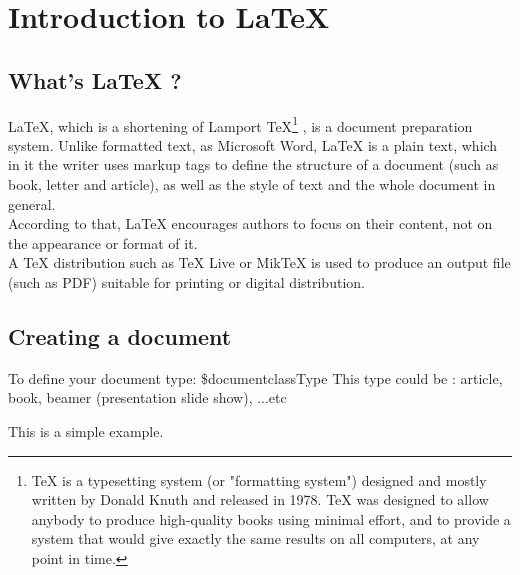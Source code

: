 \chapter{Introduction to LaTeX}

\section{What's LaTeX ?}
\huge LaTeX, \normalsize {which is a shortening of Lamport TeX\footnote[1]{ TeX is a typesetting system (or "formatting system") designed and mostly written by Donald Knuth and released in 1978. TeX was designed to allow anybody to produce high-quality books using minimal effort, and to provide a system that would give exactly the same results on all computers, at any point in time.}
	, is a document preparation system. Unlike formatted text, as Microsoft Word, LaTeX is a plain text, which in it the writer uses markup tags to define the structure of a document (such as book, letter and article), as well as the style of text and the whole document in general.
\\According to that, LaTeX encourages authors to focus on their content, not on the appearance or format of it.
\\A TeX distribution such as TeX Live or MikTeX is used to produce an output file (such as PDF) suitable for printing or digital distribution.}


\section{Creating a document}


To define your document type:
\$documentclass{Type}
This type could be : article, book, beamer (presentation slide show), ...etc


	This is a simple example.
	



